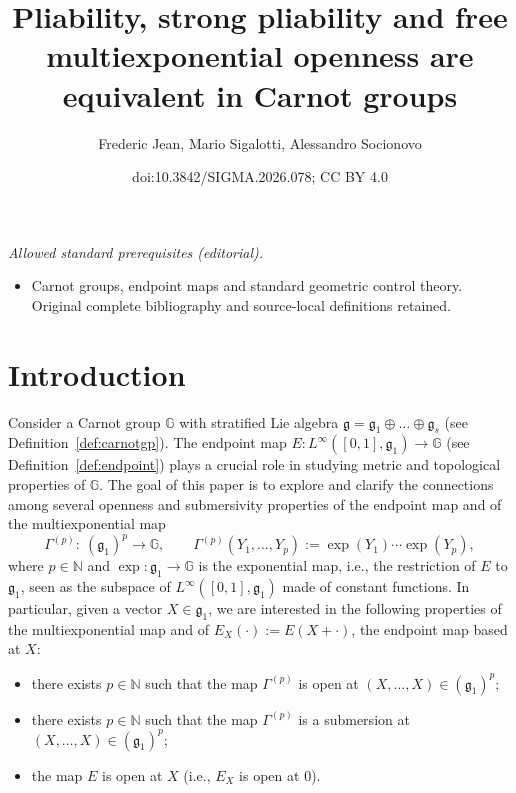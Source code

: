 \documentclass[10pt,a4paper]{amsart}
\title{Pliability, strong pliability and free multiexponential openness are equivalent in Carnot groups}
\author{Frederic Jean, Mario Sigalotti, Alessandro Socionovo}
\date{doi:10.3842/SIGMA.2026.078; CC BY 4.0}
\numberwithin{equation}{section}
\theoremstyle{definition}
\begin{document}
\maketitle
\noindent\textit{Allowed standard prerequisites (editorial).}\begin{itemize}
\item Carnot groups, endpoint maps and standard geometric control theory. Original complete bibliography and source-local definitions retained.
\end{itemize}\medskip
\section{Introduction}

Consider a Carnot group $\mathbb{G}$ with stratified Lie algebra ${\mathfrak g}={\mathfrak g}_1\oplus \dots \oplus {\mathfrak g}_s$ (see Definition~\ref{def:carnotgp}).
The endpoint map $E\colon L^\infty([0,1],{\mathfrak g}_1)\to \mathbb{G}$ (see Definition~\ref{def:endpoint})
 plays a crucial role in studying
metric and topological properties of $\mathbb{G}$. The goal of this paper is to explore and clarify the connections among several openness and submersivity properties of the endpoint map and of the multiexponential map
\begin{equation*} %
 \Gamma^{(p)}\colon \ ({\mathfrak g}_1)^p\to\mathbb{G}, \qquad \Gamma^{(p)}(Y_1,\dots,Y_p):=\exp(Y_{1})\cdots \exp(Y_{p}),
\end{equation*}
where $p\in \mathbb{N}$ and $\exp\colon {\mathfrak g}_1\to\mathbb{G}$ is the exponential map, i.e., the restriction of $E$ to ${\mathfrak g}_1$, seen as the subspace of $L^\infty([0,1],{\mathfrak g}_1)$ made of constant functions. In particular, given a vector $X\in{\mathfrak g}_1$, we are interested in the following properties of the multiexponential map and of $E_X(\cdot):=E(X+\cdot)$, the endpoint map based at $X$:
\begin{itemize}\itemsep=0pt\setlength{\leftskip}{0.22cm}
 \item[(H)] there exists $p\in\mathbb{N}$ such that the map $\Gamma^{(p)}$ is open at $(X,\dots,X)\in({\mathfrak g}_1)^p$;
 \item[(SbH)] there exists $p\in\mathbb{N}$ such that the map $\Gamma^{(p)}$ is a submersion at $(X,\dots,X)\in({\mathfrak g}_1)^p$;
 \item[(P)] the map $E$ is open at $X$ (i.e., $E_X$ is open at 0).
\end{itemize}
\end{document}
